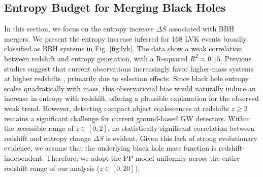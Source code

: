 \documentclass[twocolumn]{aastex631}
\begin{document}
\subsection{Entropy Budget for Merging Black Holes}
\label{subsec:merging_bud}
In this section, we focus on the entropy increase $\Delta S$ associated with BBH mergers. We present the entropy increase inferred for 168 LVK events broadly classified as BBH systems in Fig. \ref{fig:lvk}. The data show a weak correlation between redshift and entropy generation, with a R-squared $R^2\approx0.15$. Previous studies suggest that current observations increasingly favor higher-mass systems at higher redshifts \citep{heinzel2023probingcorrelationsbinaryblack, heinzel2024nonparametricanalysiscorrelationsbinary, Rinaldi_2024}, primarily due to selection effects.  Since black hole entropy scales quadratically with mass, this observational bias would naturally induce an increase in entropy with redshift, offering a plausible explanation for the observed weak trend. However, detecting compact object coalescences at redshifts $z \geq 2$ remains a significant challenge for current ground-based GW detectors. Within the accessible range of $z \in [0,2]$, no statistically significant correlation between redshift and entropy change $\Delta S$ is evident. Given this lack of strong evolutionary evidence, we assume that the underlying black hole mass function is redshift-independent. Therefore, we adopt the PP model uniformly across the entire redshift range of our analysis ($z \in [0,20]$).
\end{document}
